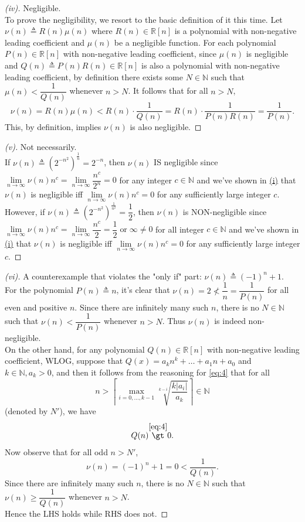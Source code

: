 \begin{proof}[(iv)]
    Negligible.\\
    To prove the negligibility, we resort to the basic definition of it this time. Let $\nu(n) \triangleq R(n)\mu(n)$ where $R(n)\in\mathbb{R}[n]$ is a  polynomial with non-negative leading coefficient and $\mu(n)$ be a negligible function. For each polynomial $P(n)\in\mathbb{R}[n]$ with non-negative leading coefficient, since $\mu(n)$ is negligible and $Q(n)\triangleq P(n)R(n)\in \mathbb{R}[n]$ is also a polynomial with non-negative leading coefficient, by definition there exists some $N\in\mathbb{N}$ such that $\mu(n)\lt \dfrac{1}{Q(n)}$ whenever $n\gt N$. It follows that for all $n\gt N$,
    \[
    \nu(n)=R(n)\mu(n)\lt R(n)\cdot \dfrac{1}{Q(n)}=R(n)\cdot \dfrac{1}{P(n)R(n)}=\dfrac{1}{P(n)}.
    \]
    This, by definition, implies $\nu(n)$ is also negligible.
\end{proof}

\begin{proof}[(v)]
    Not necessarily.\\
    If $\nu(n)\triangleq (2^{-n^2})^\frac{1}{n}=2^{-n}$, then $\nu(n)$ IS negligible since $\lim\limits_{n\to\infty}\nu(n)n^c =\lim\limits_{n\to\infty}\dfrac{n^c}{2^n}=0$ for any integer $c\in\mathbb{N}$ and we've shown in \hyperref[pf:1-i]{(i)} that $\nu(n)$ is negligible iff $\lim\limits_{n\to \infty} \nu(n)n^c = 0$ for any sufficiently large integer $c$.\\
    However, if $\nu(n)\triangleq (2^{-n^2})^\frac{1}{n^2}=\dfrac{1}{2}$,  then $\nu(n)$ is NON-negligible since $\lim\limits_{n\to\infty}\nu(n)n^c =\lim\limits_{n\to\infty}\dfrac{n^c}{2}=\dfrac{1}{2}\; \text{or}\; \infty\neq 0$ for all integer $c\in\mathbb{N}$ and we've shown in \hyperref[pf:1-i]{(i)} that $\nu(n)$ is negligible iff $\lim\limits_{n\to \infty} \nu(n)n^c = 0$ for any sufficiently large integer $c$.
\end{proof}

\begin{proof}[(vi)]
    A counterexample that violates the "only if" part: $\nu(n)\triangleq (-1)^n+1$.\\
    For the polynomial $P(n)\triangleq n$, it's clear that $\nu(n)=2\not\lt \dfrac{1}{n}=\dfrac{1}{P(n)}$ for all even and positive $n$. Since there are infinitely many such $n$, there is no $N\in \mathbb{N}$ such that $\nu(n)\lt \dfrac{1}{P(n)}$ whenever $n\gt N$. Thus $\nu(n)$ is indeed non-negligible.\\
    On the other hand, for any polynomial $Q(n)\in\mathbb{R}[n]$ with non-negative leading coefficient, WLOG, suppose that $Q(x)=a_k n^k +\ldots+a_1 n+a_0$ and $k\in\mathbb{N}, a_k\gt 0$, and then it follows from the reasoning for \eqref{eq:4} that for all 
    \[ n\gt \left\lceil\max\limits_{i=0,\ldots,k-1} \sqrt[k-i]{\dfrac{k|a_i|}{a_k}}\right\rceil \in \mathbb{N} \]
    (denoted by $N'$), we have \[Q(n)\overset{\eqref{eq:4}}{\gt} 0.\]
    Now observe that for all odd $n\gt N'$, 
    \[ \nu(n)=(-1)^n+1=0\lt \dfrac{1}{Q(n)}. \]
    Since there are infinitely many such $n$, there is no $N\in \mathbb{N}$ such that $\nu(n)\ge \dfrac{1}{Q(n)}$ whenever $n\gt N$.\\
    Hence the LHS holds while RHS does not.
\end{proof}

